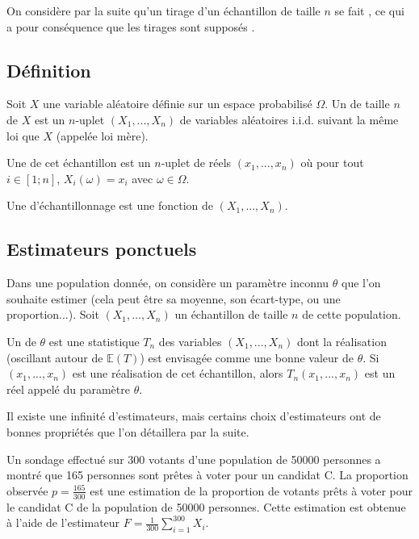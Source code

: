 On considère par la suite qu'un tirage d'un échantillon de taille $n$ se fait , ce qui a pour conséquence que les tirages sont supposés .

\subsection{Définition}
\begin{definition}{}{}
	Soit $X$ une variable aléatoire définie sur un espace probabilisé $\Omega$. Un  de taille $n$ de $X$ est un $n$-uplet $(X_1,...,X_n)$ de variables aléatoires i.i.d. suivant la même loi que $X$ (appelée loi mère). 
	
	Une  de cet échantillon est un $n$-uplet de réels $(x_1,...,x_n)$ où pour tout $i \in [1;n]$, $X_i(\omega)=x_i$ avec $\omega \in \Omega$.
\end{definition}

\begin{definition}{}{}
	Une  d'échantillonnage est une fonction de $(X_1,...,X_n)$.
\end{definition}

\subsection{Estimateurs ponctuels}



Dans une population donnée, on considère un paramètre inconnu $\theta$ que l'on souhaite estimer (cela peut être sa moyenne, son écart-type, ou une proportion...). Soit $(X_1,...,X_n)$ un échantillon de taille $n$ de cette population.

\begin{definition}{}{}
	Un  de $\theta$ est une statistique $T_n$ des variables $(X_1,...,X_n)$ dont la réalisation (oscillant autour de $\mathbb{E}(T)$) est envisagée comme une \og bonne \fg{} valeur de $\theta$. Si $(x_1,...,x_n)$ est une réalisation de cet échantillon, alors $T_n(x_1,...,x_n)$ est un réel appelé  du paramètre $\theta$.
\end{definition}

Il existe une infinité d'estimateurs, mais certains choix d'estimateurs ont de bonnes propriétés que l'on détaillera par la suite.

\begin{exemple}{}{}
	Un sondage effectué sur 300 votants d'une population de 50000 personnes a montré que 165 personnes sont prêtes à voter pour un candidat C. La proportion observée $p=\frac{165}{300}$ est une estimation de la proportion de votants prêts à voter pour le candidat C de la population de 50000 personnes.  Cette estimation est obtenue à l'aide de l'estimateur $F=\frac{1}{300}\sum_{i=1}^{300} X_i$.
\end{exemple}


